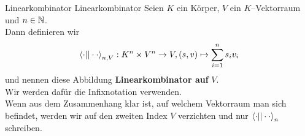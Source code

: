 \begin{definition}{Linearkombinator}
                  {Linearkombinator}
Seien $K$ ein Körper, $V$ ein $K$--Vektorraum und $n \in \mathbb{N}$.\\
Dann definieren wir \[
\left\langle \cdot ||\cdot\cdot\right\rangle_{n, V}: K^n \times V^n \rightarrow V, 
    \left(s, v \right) \mapsto \sum_{i=1}^n s_iv_i
\]
und nennen diese Abbildung \textbf{Linearkombinator auf }$V$.\\
Wir werden dafür die Infixnotation verwenden.\\
Wenn aus dem Zusammenhang klar ist, auf welchem Vektorraum man sich befindet,
werden wir auf den zweiten Index $V$ verzichten und nur 
$\left\langle \cdot ||\cdot\cdot\right\rangle_n$ schreiben.
\end{definition}